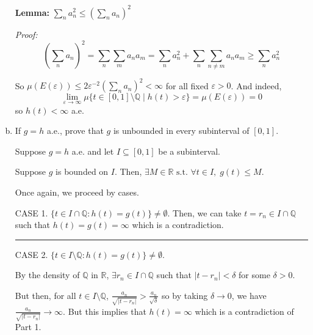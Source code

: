 \documentclass[12pt]{report}
\newcommand{\R}{\mathbb{R}}
\newcommand{\Q}{\mathbb{Q}}
\newcommand{\abs}[1]{\left\vert #1 \right\vert}
\newcommand{\ep}{\varepsilon}
\newcommand{\sub}{\subseteq}
\newcommand{\st}{\text{ s.t. }}
\renewcommand{\div}{\vspace*{10pt}\hrule\vspace*{10pt}}
\newcommand*{\tbf}[1]{\ifmmode\mathbf{#1}\else\textbf{#1}\fi}
\newenvironment*{proof}[1][blue]{
\begin{tcolorbox}[
    parbox=false,
    colback=#1!5!white,
    colframe=#1!75!black,
    breakable
]}
{\end{tcolorbox}}
\begin{document}
\begin{enumerate}[(a)]
            \tbf{Lemma:} $\sum_n a_n^2 \leq \left(\sum_n a_n\right)^2$

            \begin{proof}
                \emph{Proof:} 
                \[\left(\sum_n a_n\right)^2 = \sum_n \sum_m a_n a_m = \sum_n a_n^2 + \sum_n \sum_{n\neq m} a_n a_m \geq \sum_n a_n^2\]
            \end{proof}

            So $\mu(E(\ep)) \leq 2\ep^{-2} \left(\sum_n a_n\right)^2 < \infty$ for all fixed $\ep >0$. And indeed, 
            \[\lim_{\ep\to \infty} \mu\{t \in [0, 1] \setminus \Q \; | \; h(t) > \ep\} =\mu(E(\ep)) = 0\]
            so $h(t) < \infty$ a.e.
        \color{black}

    \item If $g = h$ a.e., prove that $g$ is unbounded in every subinterval of $[0, 1]$.
    
        \color{blue}
            Suppose $g = h$ a.e. and let $I \sub [0, 1]$ be a subinterval. 

            Suppose $g$ is bounded on $I$. Then, $\exists M \in \R \st \forall t \in I, \; g(t) \leq M$. 

            Once again, we proceed by cases. 

            CASE 1. $\{t \in I \cap \Q: h(t) = g(t)\} \neq \emptyset$. Then, we can take $t = r_n \in I \cap \Q$ such that $h(t) = g(t) = \infty$ which is a contradiction.

            \div 

            CASE 2. $\{t \in I \setminus \Q: h(t) = g(t)\} \neq \emptyset$. 

            By the density of $\Q$ in $\R$, $\exists r_n \in I \cap \Q$ such that $\abs{t - r_n} < \delta$ for some $\delta > 0$. 

            But then, for all $t \in I \setminus \Q$, $\frac{a_n}{\sqrt{\abs{t - r_n}}} > \frac{a_n}{\sqrt \delta}$ so by taking $\delta \to 0$, we have $\frac{a_n}{\sqrt{\abs{t - r_n}}} \to \infty$. But this implies that $h(t) = \infty$ which is a contradiction of Part 1. 

            
        \color{black}

\end{enumerate}

\pagebreak
\end{document}
